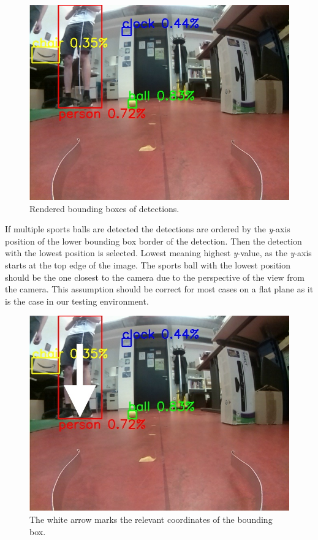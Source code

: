 \begin{figure}[!ht]
\centering
\includegraphics[width=\linewidth]{images/implementation/detection_bounding_box_rendered}
\caption{Rendered bounding boxes of detections.}
\label{fig:detection_bounding_box_rendered}
\end{figure}


If multiple sports balls are detected the detections are ordered by the \textit{y}-axis position of the lower bounding box border of the detection. Then the detection with the lowest position is selected. Lowest meaning highest \textit{y}-value, as the \textit{y}-axis starts at the top edge of the image. The sports ball with the lowest position should be the one closest to the camera due to the perspective of the view from the camera. This assumption should be correct for most cases on a flat plane as it is the case in our testing environment.


\begin{figure}[!ht]
\centering
\includegraphics[width=\linewidth]{images/implementation/bounding_box_position}
\caption{The white arrow marks the relevant coordinates of the bounding box.}
\label{fig:bounding_box_position}
\end{figure}


